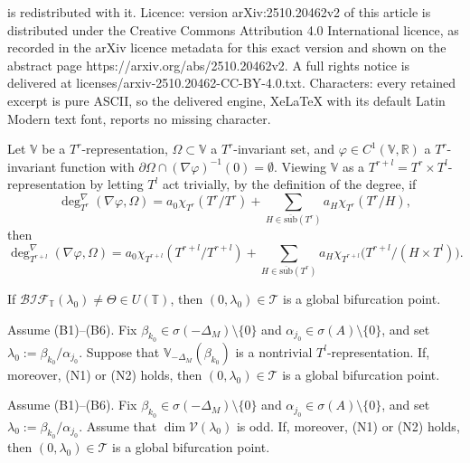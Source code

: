 \documentclass[10pt,a4paper]{amsart}
\newcommand{\bT}{\mathbb{T}}
\newcommand{\bV}{\mathbb{V}}
\newcommand{\bif}{\mathcal{BIF}}
\newcommand{\cT}{\mathcal{T}}
\newcommand{\cV}{\mathcal{V}}
\newcommand{\sub}{\overline{\mathrm{sub}}}
\begin{document}
is redistributed with it. Licence: version arXiv:2510.20462v2 of this article is distributed under the Creative Commons Attribution 4.0 International licence, as recorded in the arXiv licence metadata for this exact version and shown on the abstract page https://arxiv.org/abs/2510.20462v2. A full rights notice is delivered at licenses/arxiv-2510.20462-CC-BY-4.0.txt. Characters: every retained excerpt is pure ASCII, so the delivered engine, XeLaTeX with its default Latin Modern text font, reports no missing character.
\begin{Remark}\label{rem:lift-degree-to-big-torus}
Let $\bV$ be a $T^{r}$-representation, $\Omega\subset \bV$ a $T^{r}$-invariant set, and $\varphi\in C^{1}(\bV,\mathbb{R})$ a $T^{r}$-invariant function with $\partial\Omega\cap(\nabla\varphi)^{-1}(0)=\emptyset$. Viewing $\bV$ as a $T^{r+l}=T^{r}\times T^{l}$-representation by letting $T^{l}$ act trivially, by the definition of the degree, if
\[
\deg^{\nabla}_{T^{r}}(\nabla\varphi,\Omega)
= a_{0} \chi_{T^{r}}(T^{r}/T^{r})+\sum_{H\in\sub(T^{r})} a_{H} \chi_{T^{r}}(T^{r}/H),
\]
 then
\[
\deg^{\nabla}_{T^{r+l}}(\nabla\varphi,\Omega)
= a_{0} \chi_{T^{r+l}}(T^{r+l}/T^{r+l})+\sum_{H\in\sub(T^{r})} a_{H} \chi_{T^{r+l}}\bigl(T^{r+l}/(H\times T^{l})\bigr).
\]
\end{Remark}

\begin{Theorem}\label{thm:bif-index-global}
If $\bif_{\bT}(\lambda_{0})\neq\Theta\in U(\bT)$, then $(0,\lambda_0)\in\mathcal T$ is a global bifurcation point.
\end{Theorem}

\begin{Theorem}\label{thm:global-bifurcation}
Assume \textnormal{(B1)}--\textnormal{(B6)}. Fix $\beta_{k_{0}}\in\sigma(-\Delta_{M})\setminus\{0\}$ and $\alpha_{j_{0}}\in\sigma(A)\setminus\{0\}$, and set $\lambda_{0}:=\beta_{k_{0}}/\alpha_{j_{0}}$.
Suppose that $\bV_{-\Delta_{M}}(\beta_{k_{0}})$ is a nontrivial $T^{l}$-representation.
If, moreover, \textnormal{(N1)} or \textnormal{(N2)} holds,
then $(0,\lambda_{0})\in\cT$ is a global bifurcation point.
\end{Theorem}

\begin{Theorem}\label{thm:global-bifurcation-trivial}
Assume \textnormal{(B1)}--\textnormal{(B6)}. Fix $\beta_{k_{0}}\in\sigma(-\Delta_{M})\setminus\{0\}$ and $\alpha_{j_{0}}\in\sigma(A)\setminus\{0\}$, and set $\lambda_{0}:=\beta_{k_{0}}/\alpha_{j_{0}}$.
Assume that $\dim \cV(\lambda_0)$ is odd.
If, moreover, \textnormal{(N1)} or \textnormal{(N2)} holds,
then $(0,\lambda_{0})\in\cT$ is a global bifurcation point.
\end{Theorem}
\end{document}
